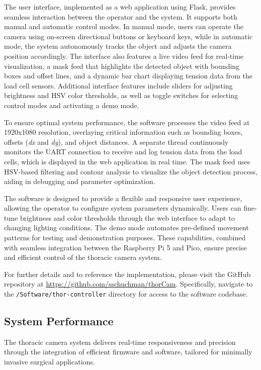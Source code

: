 The user interface, implemented as a web application using Flask, provides seamless interaction between the operator and the system. It supports both manual and automatic control modes. In manual mode, users can operate the camera using on-screen directional buttons or keyboard keys, while in automatic mode, the system autonomously tracks the object and adjusts the camera position accordingly. The interface also features a live video feed for real-time visualization, a mask feed that highlights the detected object with bounding boxes and offset lines, and a dynamic bar chart displaying tension data from the load cell sensors. Additional interface features include sliders for adjusting brightness and HSV color thresholds, as well as toggle switches for selecting control modes and activating a demo mode.

To ensure optimal system performance, the software processes the video feed at 1920x1080 resolution, overlaying critical information such as bounding boxes, offsets (\textit{dx} and \textit{dy}), and object distances. A separate thread continuously monitors the UART connection to receive and log tension data from the load cells, which is displayed in the web application in real time. The mask feed uses HSV-based filtering and contour analysis to visualize the object detection process, aiding in debugging and parameter optimization.

The software is designed to provide a flexible and responsive user experience, allowing the operator to configure system parameters dynamically. Users can fine-tune brightness and color thresholds through the web interface to adapt to changing lighting conditions. The demo mode automates pre-defined movement patterns for testing and demonstration purposes. These capabilities, combined with seamless integration between the Raspberry Pi 5 and Pico, ensure precise and efficient control of the thoracic camera system.

For further details and to reference the implementation, please visit the GitHub repository at \url{https://github.com/sschuchman/thorCam}. Specifically, navigate to the \texttt{/Software/thor-controller} directory for access to the software codebase.

\subsection{System Performance}
The thoracic camera system delivers real-time responsiveness and precision through the integration of efficient firmware and software, tailored for minimally invasive surgical applications.

